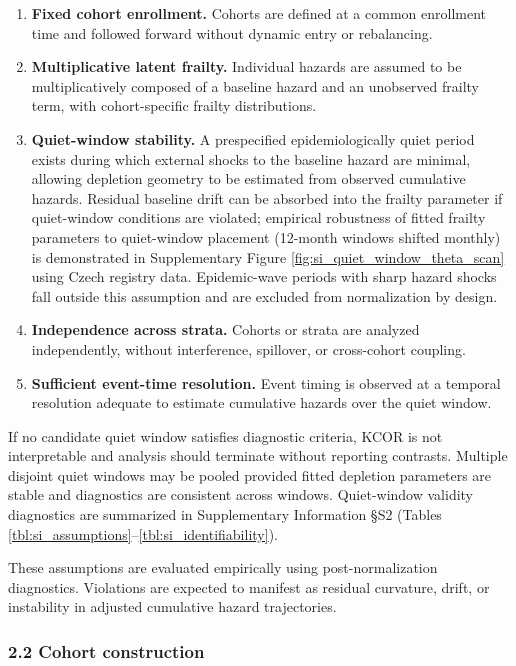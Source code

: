 \documentclass[
]{article}
\begin{document}
\begin{enumerate}
\def\labelenumi{\arabic{enumi}.}
\item
  \textbf{Fixed cohort enrollment.} Cohorts are defined at a common
  enrollment time and followed forward without dynamic entry or
  rebalancing.
\item
  \textbf{Multiplicative latent frailty.} Individual hazards are assumed
  to be multiplicatively composed of a baseline hazard and an unobserved
  frailty term, with cohort-specific frailty distributions.
\item
  \textbf{Quiet-window stability.} A prespecified epidemiologically
  quiet period exists during which external shocks to the baseline
  hazard are minimal, allowing depletion geometry to be estimated from
  observed cumulative hazards. Residual baseline drift can be absorbed
  into the frailty parameter if quiet-window conditions are violated;
  empirical robustness of fitted frailty parameters to quiet-window
  placement (12-month windows shifted monthly) is demonstrated in
  Supplementary Figure \ref{fig:si_quiet_window_theta_scan} using Czech
  registry data. Epidemic-wave periods with sharp hazard shocks fall
  outside this assumption and are excluded from normalization by design.
\item
  \textbf{Independence across strata.} Cohorts or strata are analyzed
  independently, without interference, spillover, or cross-cohort
  coupling.
\item
  \textbf{Sufficient event-time resolution.} Event timing is observed at
  a temporal resolution adequate to estimate cumulative hazards over the
  quiet window.
\end{enumerate}

If no candidate quiet window satisfies diagnostic criteria, KCOR is not
interpretable and analysis should terminate without reporting contrasts.
Multiple disjoint quiet windows may be pooled provided fitted depletion
parameters are stable and diagnostics are consistent across windows.
Quiet-window validity diagnostics are summarized in Supplementary
Information §S2 (Tables
\ref{tbl:si_assumptions}--\ref{tbl:si_identifiability}).

These assumptions are evaluated empirically using post-normalization
diagnostics. Violations are expected to manifest as residual curvature,
drift, or instability in adjusted cumulative hazard trajectories.

\subsubsection{2.2 Cohort construction}\label{cohort-construction}
\end{document}
